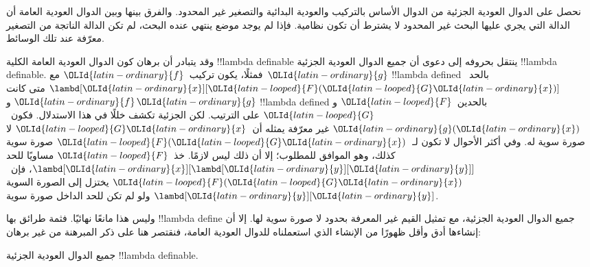 \documentclass[../../../include/open-logic-section]{subfiles}
\begin{document}

نحصل على الدوال العودية الجزئية من الدوال الأساس بالتركيب والعودية
البدائية والتصغير غير المحدود. والفرق بينها وبين الدوال العودية العامة
أن الدالة التي يجري عليها البحث غير المحدود لا يشترط أن تكون نظامية.
فإذا لم يوجد موضع ينتهي عنده البحث، لم تكن الدالة الناتجة من التصغير
معرّفة عند تلك الوسائط.

وقد يتبادر أن برهان كون الدوال العودية العامة الكلية !!{lambda definable}
ينتقل بحروفه إلى دعوى أن جميع الدوال العودية الجزئية !!{lambda definable}.
فمثلًا، يكون تركيب~${\OLId{latin-ordinary}{f}}$ مع~${\OLId{latin-ordinary}{g}}$ !!{lambda defined} بالحد~$\lambd[{\OLId{latin-ordinary}{x}}][{\OLId{latin-looped}{F}} ({\OLId{latin-looped}{G}} {\OLId{latin-ordinary}{x}})]$ متى كانت
${\OLId{latin-ordinary}{f}}$ و${\OLId{latin-ordinary}{g}}$ !!{lambda defined} بالحدين~${\OLId{latin-looped}{F}}$ و${\OLId{latin-looped}{G}}$ على الترتيب. لكن الجزئية تكشف
خللًا في هذا الاستدلال. فكون~${\OLId{latin-ordinary}{g}}({\OLId{latin-ordinary}{x}})$ غير معرّفة يمثله أن~${\OLId{latin-looped}{G}} {\OLId{latin-ordinary}{x}}$ لا
صورة سوية له. وفي أكثر الأحوال لا تكون لـ~${\OLId{latin-looped}{F}} ({\OLId{latin-looped}{G}} {\OLId{latin-ordinary}{x}})$ صورة سوية كذلك،
وهو الموافق للمطلوب؛ إلا أن ذلك ليس لازمًا. خذ~${\OLId{latin-looped}{F}}$ مساويًا للحد
$\lambd[{\OLId{latin-ordinary}{x}}][\lambd[{\OLId{latin-ordinary}{y}}][{\OLId{latin-ordinary}{y}}]]$، فإن~${\OLId{latin-looped}{F}} ({\OLId{latin-looped}{G}} {\OLId{latin-ordinary}{x}})$ يختزل إلى الصورة السوية
$\lambd[{\OLId{latin-ordinary}{y}}][{\OLId{latin-ordinary}{y}}]$ ولو لم تكن للحد الداخل صورة سوية.

وليس هذا مانعًا نهائيًا. فثمة طرائق بها !!{lambda define} جميع الدوال
العودية الجزئية، مع تمثيل القيم غير المعرفة بحدود لا صورة سوية لها.
إلا أن إنشاءها أدق وأقل ظهورًا من الإنشاء الذي استعملناه للدوال
العودية العامة، فنقتصر هنا على ذكر المبرهنة من غير برهان:


\begin{thm}
  جميع الدوال العودية الجزئية !!{lambda definable}.
\end{thm}
\end{document}
